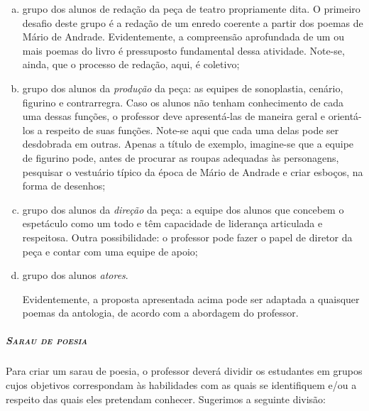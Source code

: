 \documentclass[11pt]{extarticle}
\begin{document}
\begin{enumerate}[(a)]
 
\item grupo dos alunos de redação da peça de teatro propriamente dita. O
primeiro desafio deste grupo é a redação de um enredo coerente a partir
dos poemas de Mário de Andrade. Evidentemente, a compreensão aprofundada
de um ou mais poemas do livro é pressuposto fundamental dessa atividade.
Note-se, ainda, que o processo de redação, aqui, é coletivo;

\item grupo dos alunos da \emph{produção} da peça: as equipes de
sonoplastia, cenário, figurino e contrarregra. Caso os alunos não tenham
conhecimento de cada uma dessas funções, o professor deve apresentá-las
de maneira geral e orientá-los a respeito de suas funções. Note-se aqui
que cada uma delas pode ser desdobrada em outras. Apenas a título de
exemplo, imagine-se que a equipe de figurino pode, antes de procurar as
roupas adequadas às personagens, pesquisar o vestuário típico da época
de Mário de Andrade e criar esboços, na forma de desenhos;

\item grupo dos alunos da \emph{direção} da peça: a equipe dos alunos que
concebem o espetáculo como um todo e têm capacidade de liderança
articulada e respeitosa. Outra possibilidade: o professor pode fazer o
papel de diretor da peça e contar com uma equipe de apoio;

\item grupo dos alunos \emph{atores}.

Evidentemente, a proposta apresentada acima pode ser adaptada a
quaisquer poemas da antologia, de acordo com a abordagem do professor.
\end{enumerate}

\subparagraph{\textsc{Sarau de poesia}}

Para criar um sarau de poesia, o professor deverá dividir os
estudantes em grupos cujos objetivos correspondam às habilidades com as
quais se identifiquem e/ou a respeito das quais eles pretendam conhecer.
Sugerimos a seguinte divisão:
\end{document}
